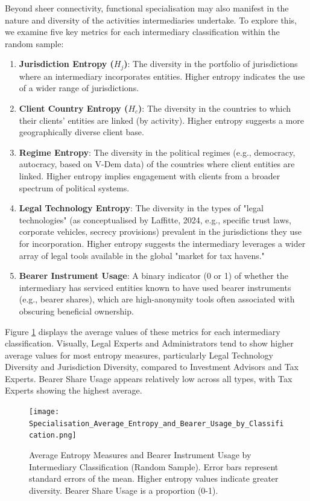 Beyond sheer connectivity, functional specialisation may also manifest in the nature and diversity of the activities intermediaries undertake. To explore this, we examine five key metrics for each intermediary classification within the random sample:
\begin{enumerate}
    \item \textbf{Jurisdiction Entropy ($H_j$)}: The diversity in the portfolio of jurisdictions where an intermediary incorporates entities. Higher entropy indicates the use of a wider range of jurisdictions.
    \item \textbf{Client Country Entropy ($H_c$)}: The diversity in the countries to which their clients' entities are linked (by activity). Higher entropy suggests a more geographically diverse client base.
    \item \textbf{Regime Entropy}: The diversity in the political regimes (e.g., democracy, autocracy, based on V-Dem data) of the countries where client entities are linked. Higher entropy implies engagement with clients from a broader spectrum of political systems.
    \item \textbf{Legal Technology Entropy}: The diversity in the types of "legal technologies" (as conceptualised by Laffitte, 2024, e.g., specific trust laws, corporate vehicles, secrecy provisions) prevalent in the jurisdictions they use for incorporation. Higher entropy suggests the intermediary leverages a wider array of legal tools available in the global "market for tax havens."
    \item \textbf{Bearer Instrument Usage}: A binary indicator (0 or 1) of whether the intermediary has serviced entities known to have used bearer instruments (e.g., bearer shares), which are high-anonymity tools often associated with obscuring beneficial ownership.
\end{enumerate}

Figure \ref{fig:specialisation_average_entropy_bearer} displays the average values of these metrics for each intermediary classification. Visually, Legal Experts and Administrators tend to show higher average values for most entropy measures, particularly Legal Technology Diversity and Jurisdiction Diversity, compared to Investment Advisors and Tax Experts. Bearer Share Usage appears relatively low across all types, with Tax Experts showing the highest average.

\begin{figure}[htbp]
    \centering
    \texttt{[image: Specialisation\_Average\_Entropy\_and\_Bearer\_Usage\_by\_Classification.png]}
    \caption{Average Entropy Measures and Bearer Instrument Usage by Intermediary Classification (Random Sample). Error bars represent standard errors of the mean. Higher entropy values indicate greater diversity. Bearer Share Usage is a proportion (0-1).}
    \label{fig:specialisation_average_entropy_bearer}
\end{figure}

